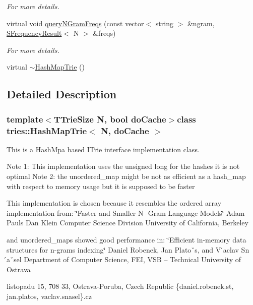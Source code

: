 \begin{DoxyCompactItemize}
\begin{DoxyCompactList}\small\item\em For more details. \end{DoxyCompactList}\item 
virtual void \hyperlink{classtries_1_1_hash_map_trie_a3ba50321b600229fb81bd1d13303f487}{query\+N\+Gram\+Freqs} (const vector$<$ string $>$ \&ngram, \hyperlink{structtries_1_1_s_frequency_result}{S\+Frequency\+Result}$<$ N $>$ \&freqs)
\begin{DoxyCompactList}\small\item\em For more details. \end{DoxyCompactList}\item 
virtual \hyperlink{classtries_1_1_hash_map_trie_a1d6c72eb8c432e1aad968c847a7b331f}{$\sim$\+Hash\+Map\+Trie} ()
\end{DoxyCompactItemize}


\subsection{Detailed Description}
\subsubsection*{template$<$T\+Trie\+Size N, bool do\+Cache$>$class tries\+::\+Hash\+Map\+Trie$<$ N, do\+Cache $>$}

This is a Hash\+Mpa based I\+Trie interface implementation class. 

Note 1\+: This implementation uses the unsigned long for the hashes it is not optimal Note 2\+: the unordered\+\_\+map might be not as efficient as a hash\+\_\+map with respect to memory usage but it is supposed to be faster

This implementation is chosen because it resembles the ordered array implementation from\+: \char`\"{}\+Faster and Smaller N -\/\+Gram Language Models\char`\"{} Adam Pauls Dan Klein Computer Science Division University of California, Berkeley

and unordered\+\_\+maps showed good performance in\+: \char`\"{}\+Efficient in-\/memory data structures for n-\/grams indexing\char`\"{} Daniel Robenek, Jan Platoˇs, and V ́aclav Sn ́aˇsel Department of Computer Science, F\+E\+I, V\+S\+B – Technical University of Ostrava
\begin{DoxyEnumerate}
\item listopadu 15, 708 33, Ostrava-\/\+Poruba, Czech Republic \{daniel.\+robenek.\+st, jan.\+platos, vaclav.\+snasel\}.cz 
\end{DoxyEnumerate}

